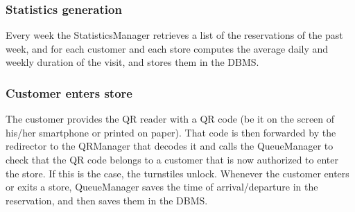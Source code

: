 \subsubsection{Statistics generation}
\begin{figure}[H]
	\noindent
\end{figure}
Every week the StatisticsManager retrieves a list of the reservations of the past week, and for each customer and each store computes the average daily and weekly duration of the visit, and stores them in the DBMS.
\subsubsection{Customer enters store}
\begin{figure}[H]
	\noindent
\end{figure}
The customer provides the QR reader with a QR code (be it on the screen of his/her smartphone or printed on paper). That code is then forwarded by the redirector to the QRManager that decodes it and calls the QueueManager to check that the QR code belongs to a customer that is now authorized to enter the store. If this is the case, the turnstiles unlock. Whenever the customer enters or exits a store, QueueManager saves the time of arrival/departure in the reservation, and then saves them in the DBMS.
